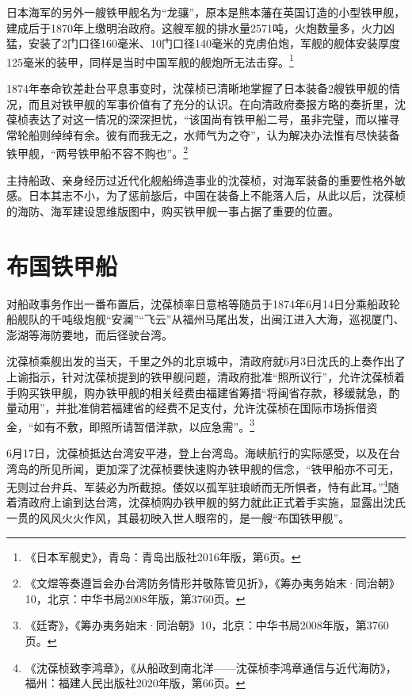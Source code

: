 \documentclass[12pt,UTF8]{ctexbook}
\begin{document}
日本海军的另外一艘铁甲舰名为“龙骧”，原本是熊本藩在英国订造的小型铁甲舰，建成后于1870年上缴明治政府。这艘军舰的排水量2571吨，火炮数量多，火力凶猛，安装了2门口径160毫米、10门口径140毫米的克虏伯炮，军舰的舰体安装厚度125毫米的装甲，同样是当时中国军舰的舰炮所无法击穿。\footnote{《日本军舰史》，青岛：青岛出版社2016年版，第6页。}

1874年奉命钦差赴台平息事变时，沈葆桢已清晰地掌握了日本装备2艘铁甲舰的情况，而且对铁甲舰的军事价值有了充分的认识。在向清政府奏报方略的奏折里，沈葆桢表达了对这一情况的深深担忧，“该国尚有铁甲船二号，虽非完璧，而以摧寻常轮船则绰绰有余。彼有而我无之，水师气为之夺”，认为解决办法惟有尽快装备铁甲舰，“两号铁甲船不容不购也”。\footnote{《文煜等奏遵旨会办台湾防务情形并敬陈管见折》，《筹办夷务始末·同治朝》10，北京：中华书局2008年版，第3760页。}

主持船政、亲身经历过近代化舰船缔造事业的沈葆桢，对海军装备的重要性格外敏感。日本其志不小，为了惩前毖后，中国在装备上不能落人后，从此以后，沈葆桢的海防、海军建设思维版图中，购买铁甲舰一事占据了重要的位置。

\section{布国铁甲船}

对船政事务作出一番布置后，沈葆桢率日意格等随员于1874年6月14日分乘船政轮船舰队的千吨级炮舰“安澜”“飞云”从福州马尾出发，出闽江进入大海，巡视厦门、澎湖等海防要地，而后径驶台湾。

沈葆桢乘舰出发的当天，千里之外的北京城中，清政府就6月3日沈氏的上奏作出了上谕指示，针对沈葆桢提到的铁甲舰问题，清政府批准“照所议行”，允许沈葆桢着手购买铁甲舰，购办铁甲舰的相关经费由福建省筹措“将闽省存款，移缓就急，酌量动用”，并批准倘若福建省的经费不足支付，允许沈葆桢在国际市场拆借资金，“如有不敷，即照所请暂借洋款，以应急需”。\footnote{《廷寄》，《筹办夷务始末·同治朝》10，北京：中华书局2008年版，第3760页。}

6月17日，沈葆桢抵达台湾安平港，登上台湾岛。海峡航行的实际感受，以及在台湾岛的所见所闻，更加深了沈葆桢要快速购办铁甲舰的信念，“铁甲船亦不可无，无则过台弁兵、军装必为所截掠。倭奴以孤军驻琅峤而无所惧者，恃有此耳。”\footnote{《沈葆桢致李鸿章》，《从船政到南北洋——沈葆桢李鸿章通信与近代海防》，福州：福建人民出版社2020年版，第66页。}随着清政府上谕到达台湾，沈葆桢购办铁甲舰的努力就此正式着手实施，显露出沈氏一贯的风风火火作风，其最初映入世人眼帘的，是一艘“布国铁甲舰”。
\end{document}
